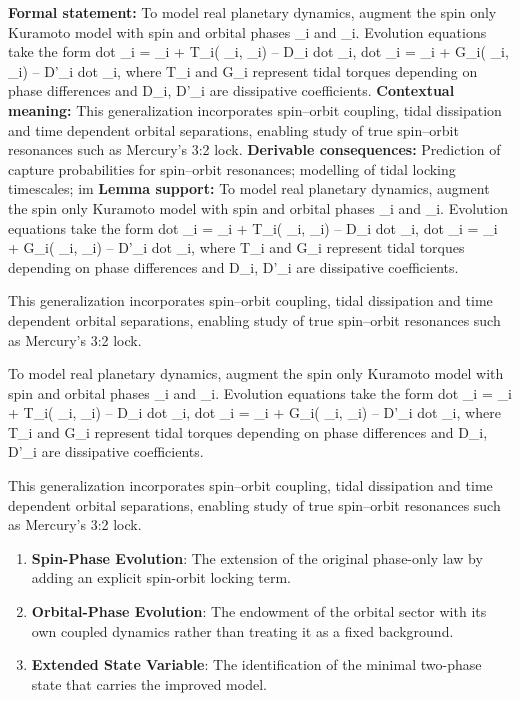 \begingroup\footnotesize\setlength{\emergencystretch}{3em}\sloppy
\textbf{Formal statement:} To model real planetary dynamics, augment the spin only Kuramoto model with spin and orbital phases  \_i and  \_i. Evolution equations take the form dot  \_i =  \_i +   T\_i( \_i,  \_i) -- D\_i   dot  \_i, dot  \_i =  \_i +   G\_i( \_i,  \_i) -- D'\_i   dot  \_i, where T\_i and G\_i represent tidal torques depending on phase differences and D\_i, D'\_i are dissipative coefficients.
\textbf{Contextual meaning:} This generalization incorporates spin--orbit coupling, tidal dissipation and time dependent orbital separations, enabling study of true spin--orbit resonances such as Mercury's 3:2 lock.
\textbf{Derivable consequences:} Prediction of capture probabilities for spin--orbit resonances; modelling of tidal locking timescales; im
\textbf{Lemma support:} To model real planetary dynamics, augment the spin only Kuramoto model with spin and orbital phases  \_i and  \_i. Evolution equations take the form dot  \_i =  \_i +   T\_i( \_i,  \_i) -- D\_i   dot  \_i, dot  \_i =  \_i +   G\_i( \_i,  \_i) -- D'\_i   dot  \_i, where T\_i and G\_i represent tidal torques depending on phase differences and D\_i, D'\_i are dissipative coefficients.\par
\endgroup

This generalization incorporates spin--orbit coupling, tidal dissipation and time dependent orbital separations, enabling study of true spin--orbit resonances such as Mercury's 3:2 lock.

To model real planetary dynamics, augment the spin only Kuramoto model with spin and orbital phases  \_i and  \_i. Evolution equations take the form dot  \_i =  \_i +   T\_i( \_i,  \_i) -- D\_i   dot  \_i, dot  \_i =  \_i +   G\_i( \_i,  \_i) -- D'\_i   dot  \_i, where T\_i and G\_i represent tidal torques depending on phase differences and D\_i, D'\_i are dissipative coefficients.

This generalization incorporates spin--orbit coupling, tidal dissipation and time dependent orbital separations, enabling study of true spin--orbit resonances such as Mercury's 3:2 lock.
\endgroup

\begin{enumerate}[leftmargin=1.6em,itemsep=6pt,topsep=4pt]
\item \textbf{Spin-Phase Evolution}: The extension of the original phase-only law by adding an explicit spin-orbit locking term.
\item \textbf{Orbital-Phase Evolution}: The endowment of the orbital sector with its own coupled dynamics rather than treating it as a fixed background.
\item \textbf{Extended State Variable}: The identification of the minimal two-phase state that carries the improved model.
\end{enumerate}

